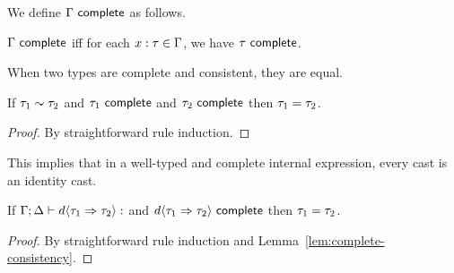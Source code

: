 We define $\Gamma~\mathsf{complete}$ as follows.
\begin{defn}
$\Gamma~\mathsf{complete}$ iff for each $x : \tau \in \Gamma$, we have $\tau~\mathsf{complete}$.
\end{defn}

When two types are complete and consistent, they are equal.

\begin{lem}\label{lem:complete-consistency} If $\tau_1 \sim \tau_2$ and $\tau_1~\mathsf{complete}$ and $\tau_2~\mathsf{complete}$ then $\tau_1 = \tau_2$.
\end{lem}
\begin{proof} By straightforward rule induction. \end{proof}

This implies that in a well-typed and complete internal expression, every cast is 
an identity cast.

\begin{lem} If $\hasType{\hGamma}{\hDelta}{\dcasttwo{\dexp}{\htau_1}{\htau_2}}$ and $d \langle{\tau_1}\Rightarrow{\tau_2}\rangle~\mathsf{complete}$ then $\tau_1 = \tau_2$. \end{lem}
\begin{proof} By straightforward rule induction and Lemma~\ref{lem:complete-consistency}. \end{proof}